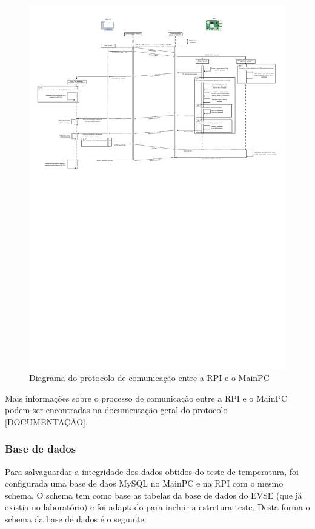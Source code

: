 \begin{figure}[H]
    \centering
    \includegraphics[width=\textwidth, clip, trim=0 16cm 0 0]{figures/communication.pdf}
    \caption{Diagrama do protocolo de comunicação entre a RPI e o MainPC}
    \label{fig:diagrama_comunicacao}
\end{figure}

Mais informações sobre o processo de comunicação entre a RPI e o MainPC podem ser encontradas na documentação geral do protocolo [DOCUMENTAÇÃO].

\subsubsection{Base de dados}

Para salvaguardar a integridade dos dados obtidos do teste de temperatura, foi configurada uma base de daos MySQL no MainPC e na RPI
com o mesmo schema. O schema tem como base as tabelas da base de dados do EVSE (que já existia no laboratório) e foi adaptado para 
incluir a estretura teste. Desta forma o schema da base de dados é o seguinte:

